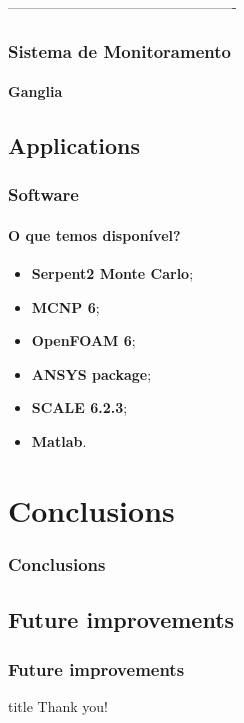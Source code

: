 \documentclass[svgnames,smaller,table]{beamer}
\begin{document}
-------------------------------------------------
\begin{frame}
  \frametitle{Sistema de Monitoramento}
  \framesubtitle{Ganglia}

\end{frame}


\subsection{Applications}
\begin{frame}
  \frametitle{Software}
  \framesubtitle{O que temos disponível?}
  \begin{itemize}
  \item \textbf{Serpent2 Monte Carlo};
  \item \textbf{MCNP 6};
  \item \textbf{OpenFOAM 6};
  \item \textbf{ANSYS package};
  \item \textbf{SCALE 6.2.3};
  \item \textbf{Matlab}.
  \end{itemize}
\end{frame}

\section{Conclusions}
\begin{frame}
  \frametitle{Conclusions}
\end{frame}

\subsection{Future improvements}
\begin{frame}
  \frametitle{Future improvements}
\end{frame}

\begin{frame}
 \vfill
  \begin{beamercolorbox}[center]{title}
     \Huge{Thank you!}
  \end{beamercolorbox}
  \vfill

\end{frame}

%        
%        


\end{document}
